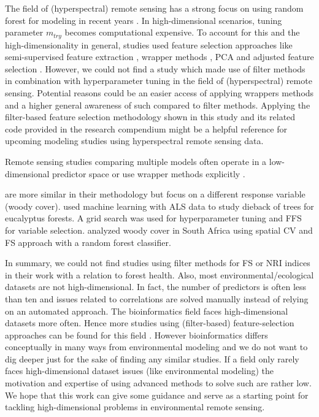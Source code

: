 \documentclass[letterpaper, peerreview, draftcls]{IEEEtran}
\begin{document}
The field of (hyperspectral) remote sensing has a strong focus on using random forest for modeling in recent years \cite{belgiu2016}.
In high-dimensional scenarios, tuning parameter \texttt{\(m_{try}\)} becomes computational expensive.
To account for this and the high-dimensionality in general, studies used feature selection approaches like semi-supervised feature extraction \cite{xia2015}, wrapper methods \cite{fassnacht2014, feng2016, georganos2018}, PCA and adjusted feature selection \cite{rochac2016}.
However, we could not find a study which made use of filter methods in combination with hyperparameter tuning in the field of (hyperspectral) remote sensing.
Potential reasons could be an easier access of applying wrappers methods and a higher general awareness of such compared to filter methods.
Applying the filter-based feature selection methodology shown in this study and its related code provided in the research compendium might be a helpful reference for upcoming modeling studies using hyperspectral remote sensing data.

Remote sensing studies comparing multiple models often operate in a low-dimensional predictor space \cite{xu2019} or use wrapper methods explicitly \cite{georganos2018}.

\cite{shendryk2016, ludwig2019} are more similar in their methodology but focus on a different response variable (woody cover).
\cite{shendryk2016} used machine learning with \ac{ALS} data to study dieback of trees for eucalyptus forests.
A grid search was used for hyperparameter tuning and \ac{FFS} for variable selection.
\cite{ludwig2019} analyzed woody cover in South Africa using spatial \ac{CV} and \ac{FS} approach \cite{meyer2018} with a random forest classifier.

In summary, we could not find studies using filter methods for \ac{FS} or \ac{NRI} indices in their work with a relation to forest health.
Also, most environmental/ecological datasets are not high-dimensional.
In fact, the number of predictors is often less than ten and issues related to correlations are solved manually instead of relying on an automated approach.
The bioinformatics field faces high-dimensional datasets more often.
Hence more studies using (filter-based) feature-selection approaches can be found for this field \cite{guo2019, radovic2017}.
However bioinformatics differs conceptually in many ways from environmental modeling and we do not want to dig deeper just for the sake of finding any similar studies.
If a field only rarely faces high-dimensional dataset issues (like environmental modeling) the motivation and expertise of using advanced methods to solve such are rather low.
We hope that this work can give some guidance and serve as a starting point for tackling high-dimensional problems in environmental remote sensing.
\end{document}
